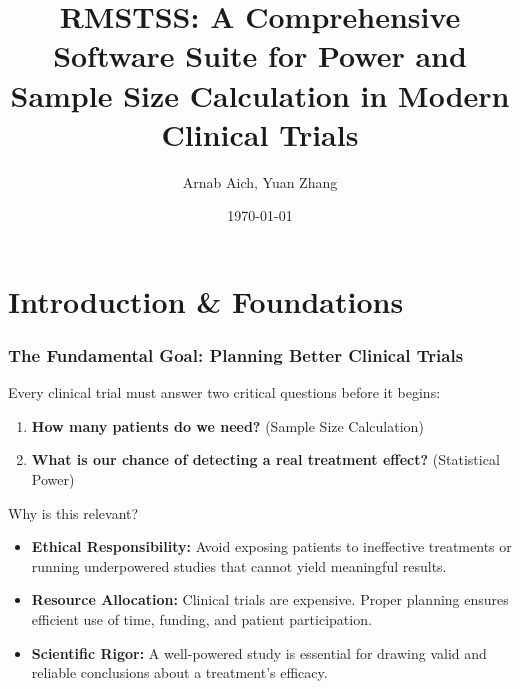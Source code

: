 \documentclass{beamer}
\title{RMSTSS: A Comprehensive Software Suite for Power and Sample Size Calculation in Modern Clinical Trials}
\author{Arnab Aich, Yuan Zhang}
\institute{Department of Preventive Medicine, UTHSC}
\date{\today}
\begin{document}
\begin{frame}
  \titlepage
\end{frame}

\section{Introduction \& Foundations}

\begin{frame}
\frametitle{The Fundamental Goal: Planning Better Clinical Trials}
Every clinical trial must answer two critical questions before it begins:

\begin{enumerate}
    \item \textbf{How many patients do we need?} (Sample Size Calculation)
    \item \textbf{What is our chance of detecting a real treatment effect?} (Statistical Power)
\end{enumerate}

\vspace{1em}

\begin{block}{Why is this relevant?}
\begin{itemize}
    \item \textbf{Ethical Responsibility:} Avoid exposing patients to ineffective treatments or running underpowered studies that cannot yield meaningful results.
    \item \textbf{Resource Allocation:} Clinical trials are expensive. Proper planning ensures efficient use of time, funding, and patient participation.
    \item \textbf{Scientific Rigor:} A well-powered study is essential for drawing valid and reliable conclusions about a treatment's efficacy.
\end{itemize}
\end{block}
\end{frame}
\end{document}
